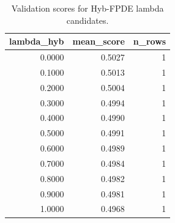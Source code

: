 \begin{table}[t]
\caption{Validation scores for Hyb-FPDE lambda candidates.}
\label{tab:lambda_distribution_computed}
\centering
\begin{tabular}{rrr}
\toprule
lambda\_hyb & mean\_score & n\_rows \\
\midrule
0.0000 & 0.5027 & 1 \\
0.1000 & 0.5013 & 1 \\
0.2000 & 0.5004 & 1 \\
0.3000 & 0.4994 & 1 \\
0.4000 & 0.4990 & 1 \\
0.5000 & 0.4991 & 1 \\
0.6000 & 0.4989 & 1 \\
0.7000 & 0.4984 & 1 \\
0.8000 & 0.4982 & 1 \\
0.9000 & 0.4981 & 1 \\
1.0000 & 0.4968 & 1 \\
\bottomrule
\end{tabular}

\end{table}
